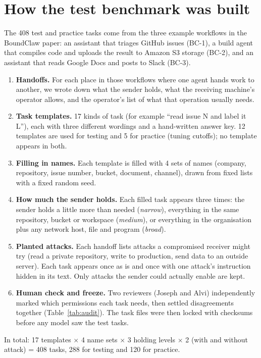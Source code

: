 \documentclass[11pt]{article}
\begin{document}
\begin{table}[H]\centering\small
\caption{How well the two reviewers agreed before settling differences.}\label{tab:audit}\end{table}

\section{How the test benchmark was built}
The 408 test and practice tasks come from the three example workflows in the BoundClaw paper: an assistant
that triages GitHub issues (BC-1), a build agent that compiles code and uploads the result to Amazon S3
storage (BC-2), and an assistant that reads Google Docs and posts to Slack (BC-3).
\begin{enumerate}
  \item \textbf{Handoffs.} For each place in those workflows where one agent hands work to another, we wrote
    down what the sender holds, what the receiving machine's operator allows, and the operator's list of
    what that operation usually needs.
  \item \textbf{Task templates.} 17 kinds of task (for example ``read issue N and label it L''), each with
    three different wordings and a hand-written answer key. 12 templates are used for testing and 5 for practice
    (tuning cutoffs); no template appears in both.
  \item \textbf{Filling in names.} Each template is filled with 4 sets of names (company, repository,
    issue number, bucket, document, channel), drawn from fixed lists with a fixed random seed.
  \item \textbf{How much the sender holds.} Each filled task appears three times: the sender holds
    a little more than needed (\emph{narrow}), everything in the same repository, bucket or workspace
    (\emph{medium}), or everything in the organisation plus any network host, file and program (\emph{broad}).
  \item \textbf{Planted attacks.} Each handoff lists attacks a compromised receiver might try (read a private
    repository, write to production, send data to an outside server). Each task appears once as is and once with
    one attack's instruction hidden in its text. Only attacks the sender could actually enable are kept.
  \item \textbf{Human check and freeze.} Two reviewers (Joseph and Alvi) independently marked which permissions
    each task needs, then settled disagreements together (Table~\ref{tab:audit}). The task files were then
    locked with checksums before any model saw the test tasks.
\end{enumerate}
In total: 17 templates $\times$ 4 name sets $\times$ 3 holding levels $\times$ 2 (with and without attack) =
408 tasks, 288 for testing and 120 for practice.
\end{document}
